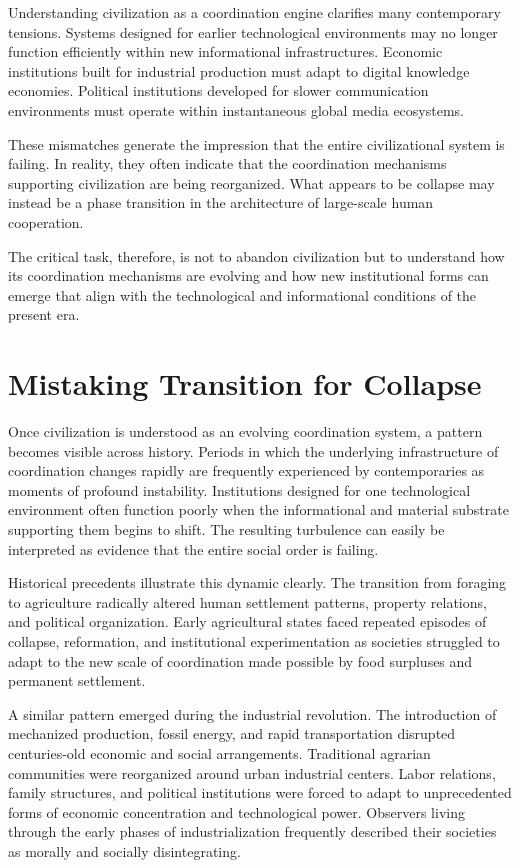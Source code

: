 \documentclass[12pt]{article}
\begin{document}
Understanding civilization as a coordination engine clarifies many contemporary tensions. Systems designed for earlier technological environments may no longer function efficiently within new informational infrastructures. Economic institutions built for industrial production must adapt to digital knowledge economies. Political institutions developed for slower communication environments must operate within instantaneous global media ecosystems.

These mismatches generate the impression that the entire civilizational system is failing. In reality, they often indicate that the coordination mechanisms supporting civilization are being reorganized. What appears to be collapse may instead be a phase transition in the architecture of large-scale human cooperation.

The critical task, therefore, is not to abandon civilization but to understand how its coordination mechanisms are evolving and how new institutional forms can emerge that align with the technological and informational conditions of the present era.

\section{Mistaking Transition for Collapse}

Once civilization is understood as an evolving coordination system, a pattern becomes visible across history. Periods in which the underlying infrastructure of coordination changes rapidly are frequently experienced by contemporaries as moments of profound instability. Institutions designed for one technological environment often function poorly when the informational and material substrate supporting them begins to shift. The resulting turbulence can easily be interpreted as evidence that the entire social order is failing.

Historical precedents illustrate this dynamic clearly. The transition from foraging to agriculture radically altered human settlement patterns, property relations, and political organization. Early agricultural states faced repeated episodes of collapse, reformation, and institutional experimentation as societies struggled to adapt to the new scale of coordination made possible by food surpluses and permanent settlement.

A similar pattern emerged during the industrial revolution. The introduction of mechanized production, fossil energy, and rapid transportation disrupted centuries-old economic and social arrangements. Traditional agrarian communities were reorganized around urban industrial centers. Labor relations, family structures, and political institutions were forced to adapt to unprecedented forms of economic concentration and technological power. Observers living through the early phases of industrialization frequently described their societies as morally and socially disintegrating.
\end{document}

